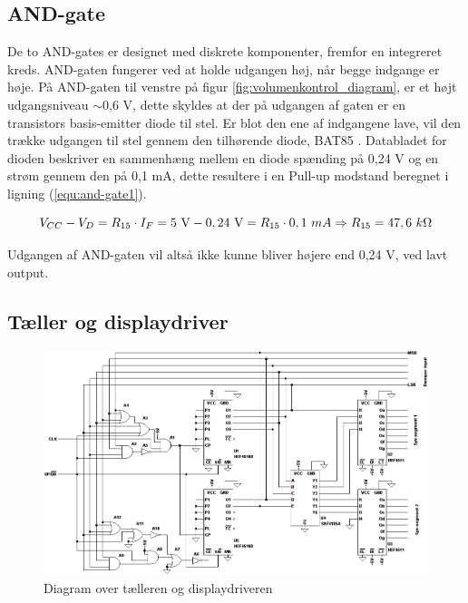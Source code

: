 \subsection*{AND-gate}
\label{volumenkontrol-design-and}

De to AND-gates er designet med diskrete komponenter, fremfor en integreret kreds. AND-gaten fungerer ved at holde udgangen høj, når begge indgange er høje. På AND-gaten til venstre på figur \ref{fig:volumenkontrol_diagram}, er et højt udgangsniveau $\sim$0,6 V, dette skyldes at der på udgangen af gaten er en transistors basis-emitter diode til stel. Er blot den ene af indgangene lave, vil den trække udgangen til stel gennem den tilhørende diode, BAT85 \cite{bat85-datablad}. Databladet for dioden beskriver en sammenhæng mellem en diode spænding på 0,24 V og en strøm gennem den på 0,1 mA, dette resultere i en Pull-up modstand beregnet i ligning (\ref{equ:and-gate1}).

\begin{equation}
\label{equ:and-gate1}
V_{CC} - V_D = R_{15} \cdot I_F = 5~\mathrm{V} - 0,24~\mathrm{V} = R_{15} \cdot 0,1~mA \Rightarrow R_{15} = 47,6~k\ohm
\end{equation}

Udgangen af AND-gaten vil altså ikke kunne bliver højere end 0,24 V, ved lavt output.

\clearpage
\subsection*{Tæller og displaydriver}
\label{volumenkontrol-design-taeller}

\begin{figure}[h]
\centering
\includegraphics[width=\textwidth]{teknisk/volumenkontrol/taeller.png}
\caption{Diagram over tælleren og displaydriveren}
\label{fig:taeller}
\end{figure}

